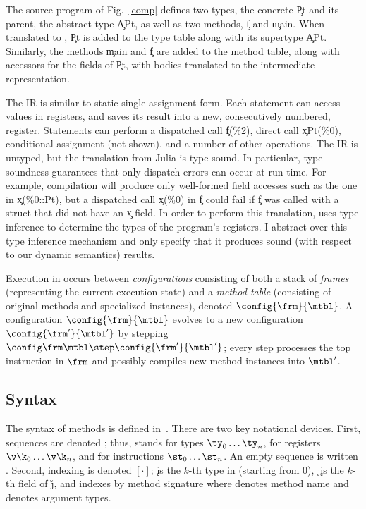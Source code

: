 The source program of Fig.~\ref{comp} defines two types, the concrete \c{Pt} and
its parent, the abstract type \c{APt}, as well as two methods, \c{f} and
\c{main}. When translated to \jules, \c{Pt} is added to the type table along
with its supertype \c{APt}. Similarly, the methods \c{main} and \c{f} are added
to the \jules method table, along with accessors for the fields of \c{Pt}, with
bodies translated to the \jules intermediate representation.

The \jules IR is similar to static single assignment form. Each statement can
access values in registers, and saves its result into a new, consecutively
numbered, register. Statements can perform a dispatched call \c{f(\%2)}, direct
call \c{x\!Pt(\%0)}, conditional assignment (not shown), and a number of other
operations. The IR is untyped, but the translation from Julia is type sound. In
particular, type soundness guarantees that only dispatch errors can occur at run
time. For example, compilation will produce only well-formed field accesses such
as the one in \c{x(\%0::Pt)}, but a dispatched call \c{x(\%0)} in \c{f} could
fail if \c{f} was called with a struct that did not have an \c{x} field. In
order to perform this translation, \jules uses type inference to determine the
types of the program's registers. I abstract over this type inference mechanism
and only specify that it produces sound (with respect to our dynamic semantics)
results. %

Execution in \jules occurs between \emph{configurations} consisting of both
a stack of \emph{frames} \frm (representing the current execution state)
and a \emph{method table} \mtbl (consisting of original methods and specialized
instances), denoted $\config{\frm}{\mtbl}$. A configuration
$\config{\frm}{\mtbl}$ evolves to a new configuration
$\config{\frm'}{\mtbl'}$ by stepping $\config\frm\mtbl \step
\config{\frm'}{\mtbl'}$; every step processes the top instruction in $\frm$
and possibly compiles new method instances into $\mtbl'$.

\subsection{Syntax}

The syntax of \jules methods is defined in~.
There are two key
notational devices. First, sequences are denoted \ol{\,\cdot\,}; thus, \ol\ty
stands for types $\ty_0\dots\ty_n$, \ol{\v\k} for registers $\v\k_0\dots\v\k_n$,
and \ol\st for instructions $\st_0\dots\st_n$. An empty sequence is written
\emp. Second, indexing is denoted $[\cdot]$; \idx{\ol\ty}\k is the $k$-th type
in \ol\ty (starting from 0), \get\j\k is the $k$-th field of \v\j, and
\idx\mtbl{\msig\m{\ol\ty}} indexes \mtbl by method signature where \m denotes
method name and \ol\ty denotes argument types.

